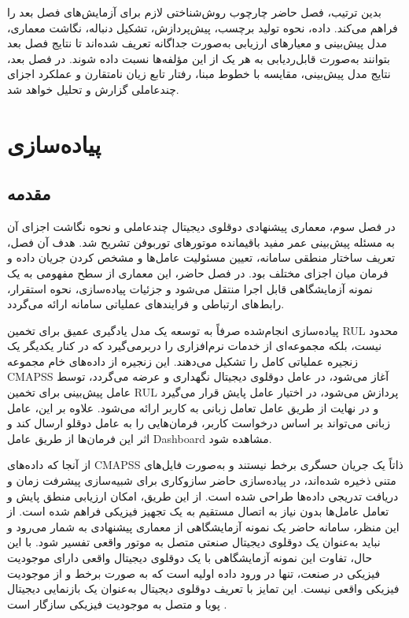 \documentclass[a4paper,fleqn]{report}
\begin{document}
بدین ترتیب، فصل حاضر چارچوب روش‌شناختی لازم برای آزمایش‌های فصل
بعد را فراهم می‌کند. داده، نحوه تولید برچسب، پیش‌پردازش، تشکیل
دنباله، نگاشت معماری، مدل پیش‌بینی و معیارهای ارزیابی به‌صورت
جداگانه تعریف شده‌اند تا نتایج فصل بعد بتوانند به‌صورت
قابل‌ردیابی به هر یک از این مؤلفه‌ها نسبت داده شوند. در فصل
بعد، نتایج مدل پیش‌بینی، مقایسه با خطوط مبنا، رفتار تابع زیان
نامتقارن و عملکرد اجزای چندعاملی گزارش و تحلیل خواهد شد.



\chapter{پیاده‌سازی}\label{chap:impl}

\section{مقدمه}

در فصل سوم، معماری پیشنهادی دوقلوی دیجیتال چندعاملی و نحوه نگاشت اجزای آن به مسئله پیش‌بینی عمر مفید باقیمانده موتورهای توربوفن تشریح شد. هدف آن فصل، تعریف ساختار منطقی سامانه، تعیین مسئولیت عامل‌ها و مشخص کردن جریان داده و فرمان میان اجزای مختلف بود. در فصل حاضر، این معماری از سطح مفهومی به یک نمونه آزمایشگاهی قابل اجرا منتقل می‌شود و جزئیات پیاده‌سازی، نحوه استقرار، رابط‌های ارتباطی و فرایندهای عملیاتی سامانه ارائه می‌گردد.

پیاده‌سازی انجام‌شده صرفاً به توسعه یک مدل یادگیری عمیق برای تخمین \gls{RUL} محدود نیست، بلکه مجموعه‌ای از خدمات نرم‌افزاری را دربرمی‌گیرد که در کنار یکدیگر یک زنجیره عملیاتی کامل را تشکیل می‌دهند. این زنجیره از داده‌های خام مجموعه \gls{CMAPSS} آغاز می‌شود، در عامل دوقلوی دیجیتال نگهداری و عرضه می‌گردد، توسط عامل پیش‌بینی برای تخمین \gls{RUL} پردازش می‌شود، در اختیار عامل پایش قرار می‌گیرد و در نهایت از طریق عامل تعامل زبانی به کاربر ارائه می‌شود. علاوه بر این، عامل زبانی می‌تواند بر اساس درخواست کاربر، فرمان‌هایی را به عامل دوقلو ارسال کند و اثر این فرمان‌ها از طریق عامل \gls{Dashboard} مشاهده شود.

از آنجا که داده‌های \gls{CMAPSS} ذاتاً یک جریان حسگری برخط نیستند و به‌صورت فایل‌های متنی ذخیره شده‌اند، در پیاده‌سازی حاضر سازوکاری برای شبیه‌سازی پیشرفت زمان و دریافت تدریجی داده‌ها طراحی شده است. از این طریق، امکان ارزیابی منطق پایش و تعامل عامل‌ها بدون نیاز به اتصال مستقیم به یک تجهیز فیزیکی فراهم شده است. از این منظر، سامانه حاضر یک نمونه آزمایشگاهی از معماری پیشنهادی به شمار می‌رود و نباید به‌عنوان یک دوقلوی دیجیتال صنعتی متصل به موتور واقعی تفسیر شود. با این حال،‌ تفاوت این نمونه آزمایشگاهی با یک دوقلوی دیجیتال واقعی دارای موجودیت فیزیکی در صنعت، تنها در ورود داده اولیه است که به صورت برخط و از موجودیت فیزیکی واقعی نیست. این تمایز با تعریف دوقلوی دیجیتال به‌عنوان یک بازنمایی دیجیتال پویا و متصل به موجودیت فیزیکی سازگار است \cite{tao2018digital,qi2021enabling}.
\end{document}
